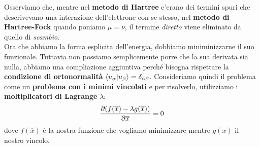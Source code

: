 Osserviamo che, mentre nel \textbf{metodo di Hartree} c'erano dei termini spuri che descrivevano una interazione dell'elettrone con se stesso, nel \textbf{metodo di Hartree-Fock} quando poniamo $\mu=\nu$, il termine \textit{diretto} viene eliminato da quello di \textit{scambio}.\\
Ora che abbiamo la forma esplicita dell'energia, dobbiamo miniminizzarne il suo funzionale. Tuttavia non possiamo semplicemente porre che la sua derivata sia nulla, abbiamo una compliazione aggiuntiva perché bisogna rispettare la \textbf{condizione di ortonormalità} $\ip{u_\alpha}{u_\beta}=\delta_{\alpha\beta}$. Consideriamo quindi il problema come un \textbf{problema con i minimi vincolati} e per risolverlo, utilizziamo i \textbf{moltiplicatori di Lagrange} $\lambda$:
\begin{equation*}
    \pderivative{(f(\overline x)-\lambda g(\overline x))}{\overline x}=0
\end{equation*}
dove $f(\overline x)$ è la nostra funzione che vogliamo minimizzare mentre $g(x)$ il nostro vincolo. \\